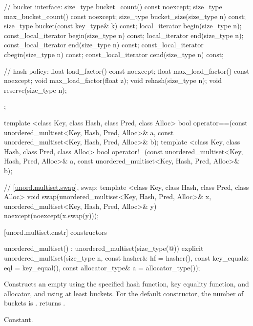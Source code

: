 \begin{codeblock}
{{    // bucket interface:
    size_type bucket_count() const noexcept;
    size_type max_bucket_count() const noexcept;
    size_type bucket_size(size_type n) const;
    size_type bucket(const key_type& k) const;
    local_iterator begin(size_type n);
    const_local_iterator begin(size_type n) const;
    local_iterator end(size_type n);
    const_local_iterator end(size_type n) const;
    const_local_iterator cbegin(size_type n) const;
    const_local_iterator cend(size_type n) const;

    // hash policy:
    float load_factor() const noexcept;
    float max_load_factor() const noexcept;
    void max_load_factor(float z);
    void rehash(size_type n);
    void reserve(size_type n);
  };

  template <class Key, class Hash, class Pred, class Alloc>
    bool operator==(const unordered_multiset<Key, Hash, Pred, Alloc>& a,
                    const unordered_multiset<Key, Hash, Pred, Alloc>& b);
  template <class Key, class Hash, class Pred, class Alloc>
    bool operator!=(const unordered_multiset<Key, Hash, Pred, Alloc>& a,
                    const unordered_multiset<Key, Hash, Pred, Alloc>& b);

  // \ref{unord.multiset.swap}, swap:
  template <class Key, class Hash, class Pred, class Alloc>
    void swap(unordered_multiset<Key, Hash, Pred, Alloc>& x,
              unordered_multiset<Key, Hash, Pred, Alloc>& y)
      noexcept(noexcept(x.swap(y)));
}
\end{codeblock}

[unord.multiset.cnstr]{ constructors}

%
\begin{itemdecl}
unordered_multiset() : unordered_multiset(size_type(@\seebelow@)) { }
explicit unordered_multiset(size_type n,
                            const hasher& hf = hasher(),
                            const key_equal& eql = key_equal(),
                            const allocator_type& a = allocator_type());
\end{itemdecl}

\begin{itemdescr}
\pnum
\effects Constructs an empty  using the
specified hash function, key equality function, and allocator, and
using at least  buckets.  For the default constructor,
the number of buckets is .
 returns .

\pnum
\complexity Constant.
\end{itemdescr}

